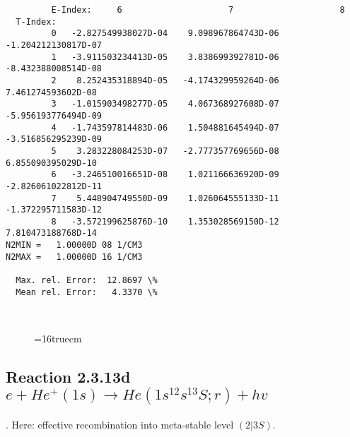 \documentclass[12pt,dvipdfmx]{article}
\begin{document}
\begin{small}
\begin{verbatim}
         E-Index:     6                     7                     8
  T-Index:
         0   -2.827549938027D-04    9.098967864743D-06   -1.204212130817D-07
         1   -3.911503234413D-05    3.838699392781D-06   -8.432388008514D-08
         2    8.252435318894D-05   -4.174329959264D-06    7.461274593602D-08
         3   -1.015903498277D-05    4.067368927608D-07   -5.956193776494D-09
         4   -1.743597814483D-06    1.504881645494D-07   -3.516856295239D-09
         5    3.283228084253D-07   -2.777357769656D-08    6.855090395029D-10
         6   -3.246510016651D-08    1.021166636920D-09   -2.826061022812D-11
         7    5.448904749550D-09    1.026064555133D-11   -1.372295711583D-12
         8   -3.572199625876D-10    1.353028569150D-12    7.810473188768D-14
N2MIN =   1.00000D 08 1/CM3
N2MAX =   1.00000D 16 1/CM3

  Max. rel. Error:  12.8697 \%
  Mean rel. Error:   4.3370 \%



\end{verbatim}\end{small}
\begin{figure} \label{2.3.13c}
\epsfxsize=16truecm
\end{figure}
\newpage

\subsection{
Reaction 2.3.13d  $e + He^+(1s) \rightarrow He(1s^12s^13S;r) + hv $ }
\cite{kn:Fujimoto}. Here: effective recombination into meta-stable
level $(2|3S)$.
\end{document}

